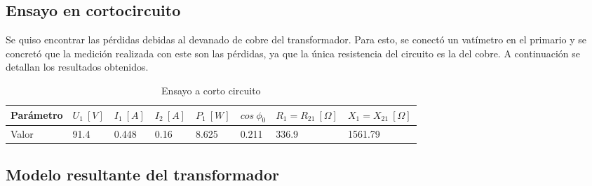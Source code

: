 \documentclass[a4paper]{article}
\begin{document}
\subsection{Ensayo en cortocircuito}
Se quiso encontrar las pérdidas debidas al devanado de cobre del transformador. Para esto, se conectó un vatímetro en el primario y se concretó que la medición realizada con este son las pérdidas, ya que la única resistencia del circuito es la del cobre. A continuación se detallan los resultados obtenidos.
\begin{table}[H]
\centering
\begin{tabular}{|l|l|l|l|l|l|l|l|}
\hline
Parámetro & $U_1 \ [V]$ & $I_1 \ [A]$ & $I_2 \ [A]$ & $P_1 \ [W]$ & $cos \ \phi_0 $  & $R_1 = R_21 \ [\Omega] $ & $X_1 = X_{21} \ [\Omega] $\\ \hline
Valor     & 91.4     & 0.448    & 0.16     & 8.625    & 0.211            & 336.9               & 1561.79             \\ \hline
\end{tabular}
\caption {Ensayo a corto circuito}
\centering
\end{table}
\subsection{Modelo resultante del transformador}
\end{document}
